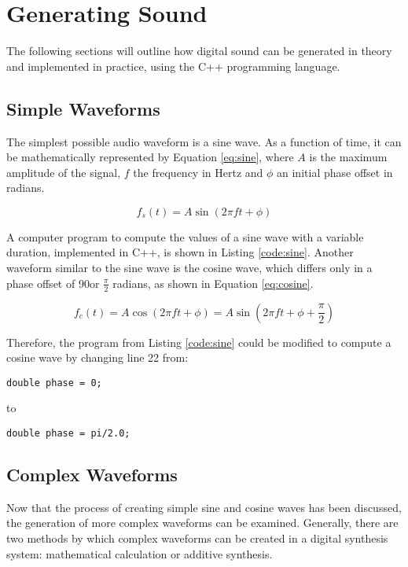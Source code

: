 \chapter{Generating Sound}

The following sections will outline how digital sound can be generated in theory and implemented in practice, using the C++ programming language.

\section{Simple Waveforms}

The simplest possible audio waveform is a sine wave. As a function of time, it can be mathematically represented by Equation \ref{eq:sine}, where $A$ is the maximum amplitude of the signal, $f$ the frequency in Hertz and $\phi$ an initial phase offset in radians.

\begin{equation}
f_{s}(t) = A \sin(2 \pi  f t + \phi)
\label{eq:sine}
\end{equation}

\noindent A computer program to compute the values of a sine wave with a variable duration, implemented in C++, is shown in Listing \ref{code:sine}. Another waveform similar to the sine wave is the cosine wave, which differs only in a phase offset of 90\degree or $\frac{\pi}{2}$ radians, as shown in Equation \ref{eq:cosine}.

\begin{equation}
f_{c}(t) = A \cos(2 \pi  f t + \phi) = A \sin(2 \pi f t + \phi + \frac{\pi}{2})
\label{eq:cosine}
\end{equation}

\noindent Therefore, the program from Listing \ref{code:sine} could be modified to compute a cosine wave by changing line 22 from:

\begin{lstlisting}[firstnumber=22]
double phase = 0;
\end{lstlisting}
to
\begin{lstlisting}[firstnumber=22]
double phase = pi/2.0;
\end{lstlisting}

\section{Complex Waveforms}

Now that the process of creating simple sine and cosine waves has been discussed, the generation of more complex waveforms can be examined. Generally, there are two methods by which complex waveforms can be created in a digital synthesis system: mathematical calculation or additive synthesis.


